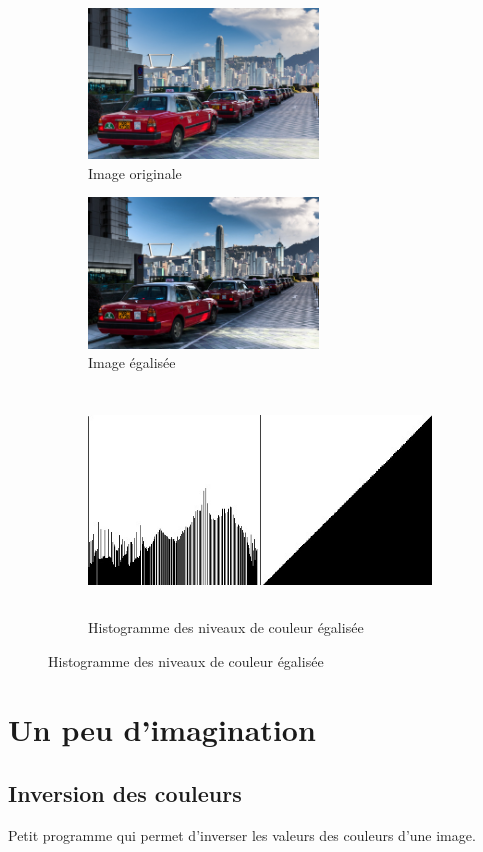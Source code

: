 \documentclass[a4paper,10pt]{article}
\begin{document}
    \begin{figure}[h]
      \begin{subfigure}{0.5\textwidth}
        \includegraphics[width=1\linewidth, height=4cm]{kowloon}
        \caption{Image originale}
        \label{fig:kowloonO}
      \end{subfigure}
      \begin{subfigure}{0.5\textwidth}
        \includegraphics[width=1\linewidth, height=4cm]{kowloon_egalise.jpeg}
        \caption{Image égalisée}
        \label{fig:kowloonO}
      \end{subfigure}
      \begin{subfigure}{1\textwidth}
        \centering
        \includegraphics[width=1\linewidth, height=6cm]{kowloon_histoEq.jpeg}   
        \caption{Histogramme des niveaux de couleur égalisée}
        \label{fig:kowloonHisto}
      \end{subfigure}
    \end{figure}

    \pagebreak
    \section{Un peu d'imagination}
    \subsection{Inversion des couleurs}
    Petit programme qui permet d'inverser les valeurs des couleurs d'une image.
\end{document}
